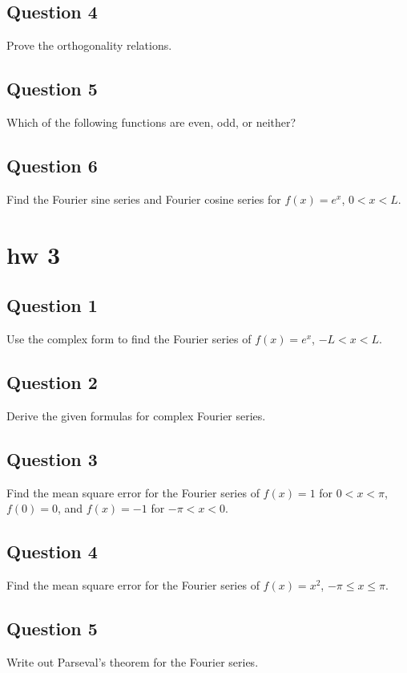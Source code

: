 \documentclass[lang=en,11pt]{template}
\begin{document}
\section*{Question 4}
Prove the orthogonality relations.

\section*{Question 5}
Which of the following functions are even, odd, or neither?

\section*{Question 6}
Find the Fourier sine series and Fourier cosine series for $f(x) = e^x$, $0 < x < L$.




\chapter{hw 3}

\section*{Question 1}
Use the complex form to find the Fourier series of $f(x) = e^x$, $-L < x < L$.

\section*{Question 2}
Derive the given formulas for complex Fourier series.

\section*{Question 3}
Find the mean square error for the Fourier series of $f(x) = 1$ for $0 < x < \pi$, $f(0) = 0$, and $f(x) = -1$ for $-\pi < x < 0$.

\section*{Question 4}
Find the mean square error for the Fourier series of $f(x) = x^2$, $-\pi \leq x \leq \pi$.

\section*{Question 5}
Write out Parseval's theorem for the Fourier series.
\end{document}

